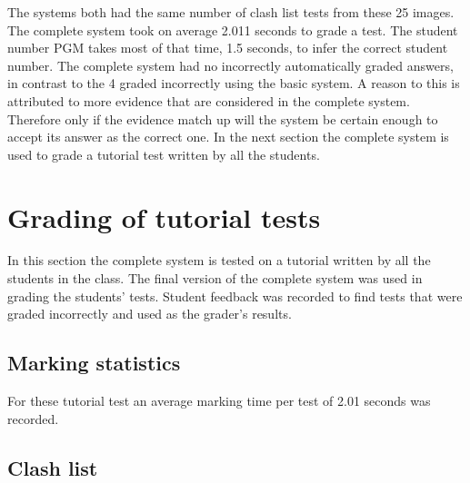 The systems both had the same number of clash list tests from these 25 images. The complete system took on average 2.011 seconds to grade a test. The student number PGM takes most of that time, 1.5 seconds, to infer the correct student number. The complete system had no incorrectly automatically graded answers, in contrast to the 4 graded incorrectly using the basic system. A reason to this is attributed to more evidence that are considered in the complete system. Therefore only if the evidence match up will the system be certain enough to accept its answer as the correct one. In the next section the complete system is used to grade a tutorial test written by all the students. 

\section{Grading of tutorial tests}
In this section the complete system is tested on a tutorial written by all the students in the class. The final version of the complete system was used in grading the students' tests. Student feedback was recorded to find tests that were graded incorrectly and used as the grader's results. 

\subsection{Marking statistics}

For these tutorial test an average marking time per test of 2.01 seconds was recorded.

\subsection{Clash list}

